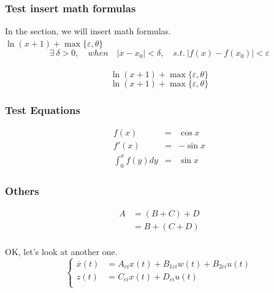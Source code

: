 \documentclass[a4paper,11pt]{article}
\begin{document}
\subsubsection{Test insert math formulas}
In the section, we will insert math formulas.\\
\begin{math}\label{math_1} \ln{(x+1)}+\max{\{\varepsilon,\theta\}} \end{math}\\
\begin{equation}\label{eq:eps} \exists~\delta>0,\quad when \quad |x-x_0|<\delta,\quad s.t.~ |f(x)-f(x_0)|<\varepsilon \end{equation}\\
\begin{displaymath}\label{math_2} \ln{(x+1)}+\max{\{\varepsilon,\theta\}} \end{displaymath}
\[\ln{(x+1)}+\max{\{\varepsilon,\theta\}}\]%

\subsubsection{Test Equations}%
\begin{eqnarray}
f(x) & = & \cos x \\
f'(x) & = & -\sin x \\
\int_{0}^{x} f(y)dy & = & \sin x
\end{eqnarray}

\subsubsection{Others}
\[
   \begin{aligned}
   A &= (B + C) + D\\
    &=B + (C + D)\\
   \end{aligned}
\]

OK, let's look at another one.
\begin{equation}
  \left\{
   \begin{aligned}
   \overset{.}x(t) &=A_{ci}x(t)+B_{1ci}w(t)+B_{2ci}u(t)  \\
   z(t) &=C_{ci}x(t)+D_{ci}u(t) \\
   \end{aligned}
   \right.
\end{equation}
\end{document}
